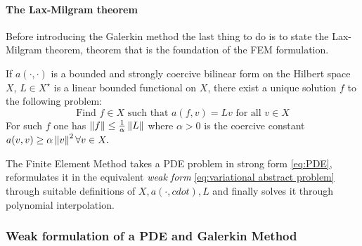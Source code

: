 \paragraph{The Lax-Milgram theorem}
Before introducing the Galerkin method the last thing to do is to state the Lax-Milgram theorem, theorem that is the foundation of the FEM formulation.
\vspace{0.5cm}
\begin{theorem}
	If \(a(\cdot, \cdot)\) is a bounded and strongly coercive bilinear form on the Hilbert space \(X\),  $L\in X^\star$ is a linear bounded functional on $X$, there exist a unique solution $f$ to the following problem:
	\begin{equation}\label{eq:variational abstract problem}
	\text{Find }f\in X\text{ such that } a(f, v)=Lv \text{ for all } v \in X
	\end{equation}
	For such \(f\) one has \(\|f\| \leq \frac{1}{\alpha}\left\lVert L\right\rVert\) where \(\alpha>0\) is the coercive constant \(a(v, v) \geq \alpha\left\lVert v\right\rVert^{2} \forall v \in X.\)
\end{theorem} 
\vspace{0.5cm}
The Finite Element Method takes a PDE problem in strong form \ref{eq:PDE}, reformulates it in the equivalent \textit{weak form} \ref{eq:variational abstract problem} through suitable definitions of $X, a(\cdot, cdot), L$ and finally solves it through polynomial interpolation.
\subsubsection{Weak formulation of a PDE and Galerkin Method}


